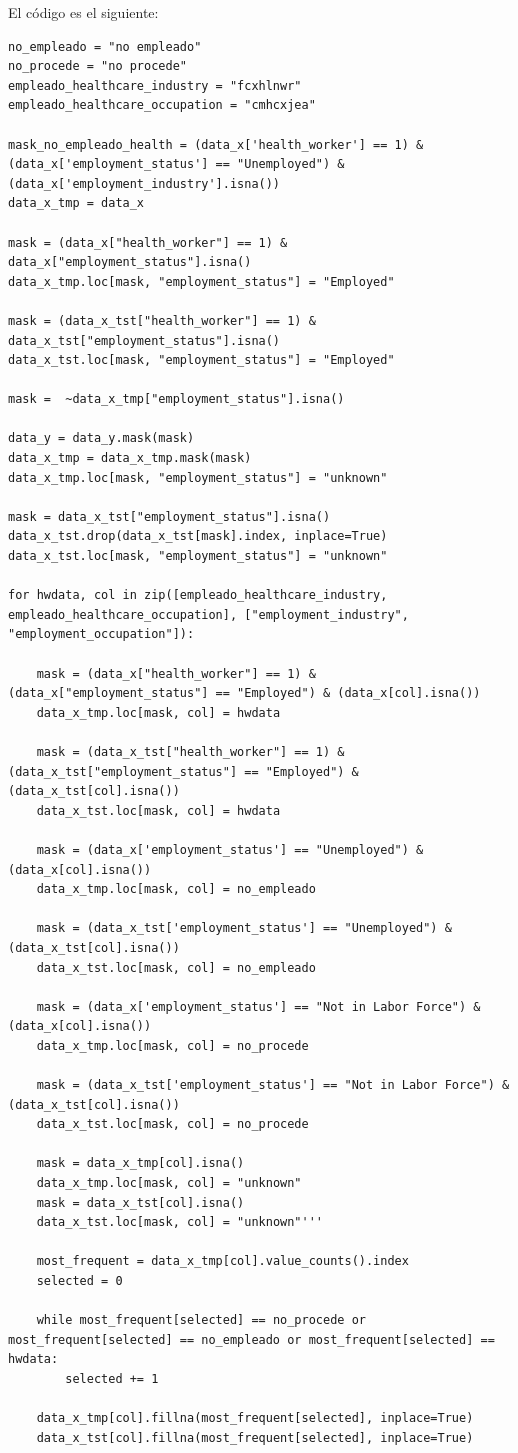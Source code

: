 \documentclass[twoside,openright,titlepage,numbers=noenddot,openany,headinclude,footinclude=true,
cleardoublepage=empty,abstractoff,BCOR=5mm,paper=a4,fontsize=12pt,main=spanish]{scrreprt}
\begin{document}
El código es el siguiente:

\begin{verbatim}
no_empleado = "no empleado"
no_procede = "no procede"
empleado_healthcare_industry = "fcxhlnwr"
empleado_healthcare_occupation = "cmhcxjea"

mask_no_empleado_health = (data_x['health_worker'] == 1) & (data_x['employment_status'] == "Unemployed") & (data_x['employment_industry'].isna())
data_x_tmp = data_x

mask = (data_x["health_worker"] == 1) &  data_x["employment_status"].isna() 
data_x_tmp.loc[mask, "employment_status"] = "Employed" 

mask = (data_x_tst["health_worker"] == 1) &  data_x_tst["employment_status"].isna() 
data_x_tst.loc[mask, "employment_status"] = "Employed" 

mask =  ~data_x_tmp["employment_status"].isna() 

data_y = data_y.mask(mask)
data_x_tmp = data_x_tmp.mask(mask)
data_x_tmp.loc[mask, "employment_status"] = "unknown"

mask = data_x_tst["employment_status"].isna() 
data_x_tst.drop(data_x_tst[mask].index, inplace=True)
data_x_tst.loc[mask, "employment_status"] = "unknown"

for hwdata, col in zip([empleado_healthcare_industry, empleado_healthcare_occupation], ["employment_industry", "employment_occupation"]):

    mask = (data_x["health_worker"] == 1) & (data_x["employment_status"] == "Employed") & (data_x[col].isna())
    data_x_tmp.loc[mask, col] = hwdata

    mask = (data_x_tst["health_worker"] == 1) & (data_x_tst["employment_status"] == "Employed") & (data_x_tst[col].isna())
    data_x_tst.loc[mask, col] = hwdata

    mask = (data_x['employment_status'] == "Unemployed") & (data_x[col].isna())
    data_x_tmp.loc[mask, col] = no_empleado

    mask = (data_x_tst['employment_status'] == "Unemployed") & (data_x_tst[col].isna())
    data_x_tst.loc[mask, col] = no_empleado

    mask = (data_x['employment_status'] == "Not in Labor Force") & (data_x[col].isna())
    data_x_tmp.loc[mask, col] = no_procede

    mask = (data_x_tst['employment_status'] == "Not in Labor Force") & (data_x_tst[col].isna())
    data_x_tst.loc[mask, col] = no_procede

    mask = data_x_tmp[col].isna()
    data_x_tmp.loc[mask, col] = "unknown"
    mask = data_x_tst[col].isna()
    data_x_tst.loc[mask, col] = "unknown"'''
    
    most_frequent = data_x_tmp[col].value_counts().index
    selected = 0

    while most_frequent[selected] == no_procede or most_frequent[selected] == no_empleado or most_frequent[selected] == hwdata:
        selected += 1
        
    data_x_tmp[col].fillna(most_frequent[selected], inplace=True)
    data_x_tst[col].fillna(most_frequent[selected], inplace=True)
\end{verbatim}
\end{document}
